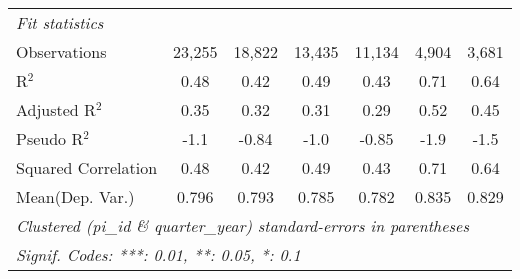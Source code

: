 \begin{tabular}{lcccccc}
   \midrule
   \emph{Fit statistics}\\
   Observations                                               & 23,255        & 18,822        & 13,435       & 11,134        & 4,904    & 3,681\\  
   R$^2$                                                      & 0.48          & 0.42          & 0.49         & 0.43          & 0.71     & 0.64\\  
   Adjusted R$^2$                                             & 0.35          & 0.32          & 0.31         & 0.29          & 0.52     & 0.45\\  
   Pseudo R$^2$                                               & -1.1          & -0.84         & -1.0         & -0.85         & -1.9     & -1.5\\  
   Squared Correlation                                        & 0.48          & 0.42          & 0.49         & 0.43          & 0.71     & 0.64\\  
Mean(Dep. Var.) & 0.796 & 0.793 & 0.785 & 0.782 & 0.835 & 0.829 \\
   \midrule \midrule
   \multicolumn{7}{l}{\emph{Clustered (pi\_id \& quarter\_year) standard-errors in parentheses}}\\
   \multicolumn{7}{l}{\emph{Signif. Codes: ***: 0.01, **: 0.05, *: 0.1}}\\
\end{tabular}
\par\endgroup
